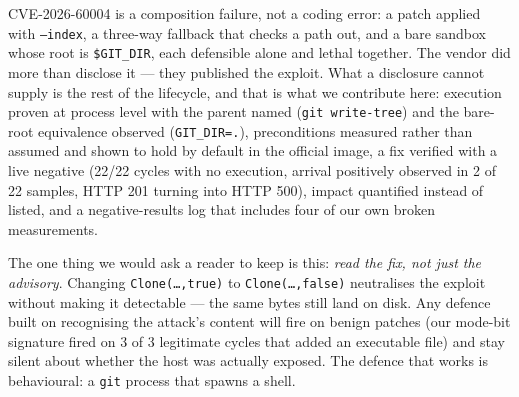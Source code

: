 CVE-2026-60004 is a composition failure, not a coding error: a patch applied
with \texttt{--index}, a three-way fallback that checks a path out, and a bare
sandbox whose root is \texttt{\$GIT\_DIR}, each defensible alone and lethal
together. The vendor did more than disclose it --- they published the exploit.
What a disclosure cannot supply is the rest of the lifecycle, and that is what
we contribute here: execution proven at process level with the parent named
(\texttt{git write-tree}) and the bare-root equivalence observed
(\texttt{GIT\_DIR=.}), preconditions measured rather than assumed and shown to
hold by default in the official image, a fix verified with a live negative
(22/22 cycles with no execution, arrival positively observed in 2 of 22 samples,
HTTP 201 turning into HTTP 500), impact
quantified instead of listed, and a negative-results log that includes four of
our own broken measurements.

The one thing we would ask a reader to keep is this: \emph{read the fix, not
just the advisory}. Changing \texttt{Clone(\dots,true)} to
\texttt{Clone(\dots,false)} neutralises the exploit without making it
detectable --- the same bytes still land on disk. Any defence built on
recognising the attack's content will fire on benign patches (our mode-bit
signature fired on 3 of 3 legitimate cycles that added an executable file) and
stay silent about whether the host was actually exposed. The defence that works is
behavioural: a \texttt{git} process that spawns a shell.

